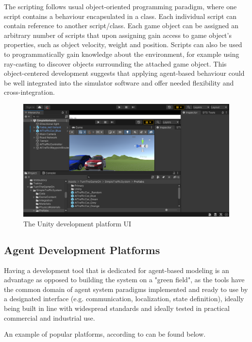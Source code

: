 \documentclass[main.tex]{subfiles}
\begin{document}
The scripting follows usual object-oriented programming paradigm, where one script contains a
behaviour encapsulated in a class. Each individual script can contain reference to another
script/class. Each game object can be assigned an arbitrary number of scripts that upon 
assigning gain access to game object's properties, such as object velocity, weight and position. 
Scripts can also be used to programmatically gain knowledge about the environment, for example 
using ray-casting to discover objects surrounding the attached game object. This object-centered 
development suggests that applying agent-based behaviour could be well integrated into the 
simulator software and offer needed flexibility and cross-integration.

\begin{figure}[htbp]
    \centering
    \includegraphics[width=.9\textwidth]{unityUI.png}
    \caption{The Unity development platform UI}
    \label{fig-unity}
\end{figure}

\subsection{Agent Development Platforms}

Having a development tool that is dedicated for agent-based modeling is an advantage as opposed to building the 
system on a "green field", as the tools have the common domain of agent system paradigms implemented and ready 
to use by a designated interface (e.g. communication, localization, state definition), ideally being built in line 
with widespread standards and ideally tested in practical commercial and industrial use. 

An example of popular platforms, according to \cite{Binder2022} can be found below. 
\end{document}
